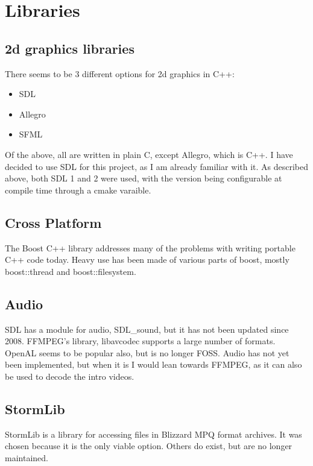    	\newpage
    
   	\section{Libraries}
       	\subsection{2d graphics libraries}
    	There seems to be 3 different options for 2d graphics in C++:
    	\begin{itemize}
    	    \item{SDL}
    	    \item{Allegro}
    	    \item{SFML}
    	\end{itemize}
    	
    	Of the above, all are written in plain C, except Allegro, which is C++.
    	I have decided to use SDL for this project, as I am already familiar with it.
    	As described above, both SDL 1 and 2 were used, with the version being configurable at compile time through a cmake varaible.
    	
    	\subsection{Cross Platform}
        The Boost C++ library addresses many of the problems with writing portable C++ code today.
     	Heavy use has been made of various parts of boost, mostly boost::thread and boost::filesystem.
        
        \subsection{Audio}
        SDL has a module for audio, SDL\_sound\cite{sdls}, but it has not been updated since 2008.
        FFMPEG's library, libavcodec\cite{libavcodec} supports a large number of formats.
        OpenAL seems to be popular also, but is no longer FOSS.
        Audio has not yet been implemented, but when it is I would lean towards FFMPEG, as it can also be used to decode the intro videos.
        
        \subsection{StormLib}
        StormLib\cite{stormlib} is a library for accessing files in Blizzard MPQ format archives.
        It was chosen because it is the only viable option. Others do exist, but are no longer maintained.
